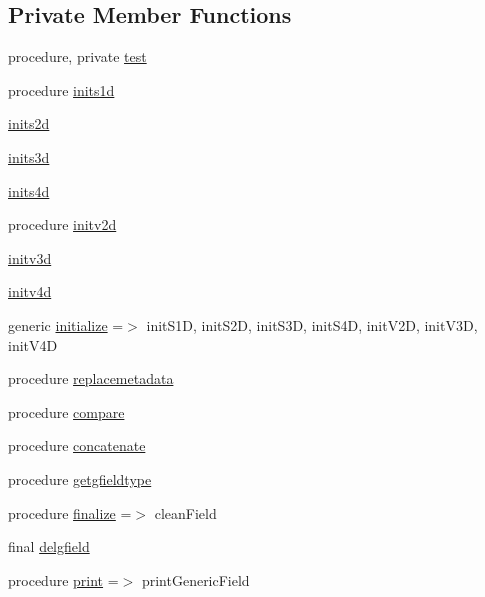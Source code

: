 \subsection*{Private Member Functions}
\begin{DoxyCompactItemize}
\item 
procedure, private \mbox{\hyperlink{structfieldtypes__mod_1_1generic__field__class_a884e1d0b4152f873edc421ee4079aafb}{test}}
\item 
procedure \mbox{\hyperlink{structfieldtypes__mod_1_1generic__field__class_a6a077022127f5450a2e77c034704ad2d}{inits1d}}
\item 
\mbox{\hyperlink{structfieldtypes__mod_1_1generic__field__class_ac813b40a98c7b82891bb51e6b0d56124}{inits2d}}
\item 
\mbox{\hyperlink{structfieldtypes__mod_1_1generic__field__class_a4de3770c55241bf94b3ffa523d3480f9}{inits3d}}
\item 
\mbox{\hyperlink{structfieldtypes__mod_1_1generic__field__class_ac5d07c1ce61968e5819ba410e003aec8}{inits4d}}
\item 
procedure \mbox{\hyperlink{structfieldtypes__mod_1_1generic__field__class_a5fbc115c9217689159b99058d1e38467}{initv2d}}
\item 
\mbox{\hyperlink{structfieldtypes__mod_1_1generic__field__class_a4641235772209bcc9558d6d6c53a80c7}{initv3d}}
\item 
\mbox{\hyperlink{structfieldtypes__mod_1_1generic__field__class_a178957bfe9f480ff799ca870d13db306}{initv4d}}
\item 
generic \mbox{\hyperlink{structfieldtypes__mod_1_1generic__field__class_a0fa61024cf22776788544cf848d767d7}{initialize}} =$>$ init\+S1D, init\+S2D, init\+S3D, init\+S4D, init\+V2D, init\+V3D, init\+V4D
\item 
procedure \mbox{\hyperlink{structfieldtypes__mod_1_1generic__field__class_a040a6a67e64938b6ce249dd6a584584f}{replacemetadata}}
\item 
procedure \mbox{\hyperlink{structfieldtypes__mod_1_1generic__field__class_a8dec8ff3e2f37167c4952805f5d189e9}{compare}}
\item 
procedure \mbox{\hyperlink{structfieldtypes__mod_1_1generic__field__class_a6424e68038376c898b08883fe1ed1304}{concatenate}}
\item 
procedure \mbox{\hyperlink{structfieldtypes__mod_1_1generic__field__class_a293a405922469cfc6e2fd61401a0bac7}{getgfieldtype}}
\item 
procedure \mbox{\hyperlink{structfieldtypes__mod_1_1generic__field__class_ab787d81bd092318c61cb43fe0b255dca}{finalize}} =$>$ clean\+Field
\item 
final \mbox{\hyperlink{structfieldtypes__mod_1_1generic__field__class_a14b5aa7f77712f703849552381484eed}{delgfield}}
\item 
procedure \mbox{\hyperlink{structfieldtypes__mod_1_1generic__field__class_a436070152766aaf4f47e56a1dba98611}{print}} =$>$ print\+Generic\+Field
\end{DoxyCompactItemize}
